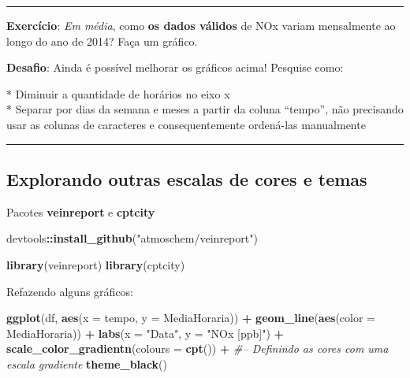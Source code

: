 \documentclass[]{book}
\newenvironment{Shaded}{\begin{snugshade}}{\end{snugshade}}
\newcommand{\KeywordTok}[1]{\textcolor[rgb]{0.13,0.29,0.53}{\textbf{#1}}}
\newcommand{\DataTypeTok}[1]{\textcolor[rgb]{0.13,0.29,0.53}{#1}}
\newcommand{\StringTok}[1]{\textcolor[rgb]{0.31,0.60,0.02}{#1}}
\newcommand{\CommentTok}[1]{\textcolor[rgb]{0.56,0.35,0.01}{\textit{#1}}}
\newcommand{\OperatorTok}[1]{\textcolor[rgb]{0.81,0.36,0.00}{\textbf{#1}}}
\newcommand{\NormalTok}[1]{#1}
\theoremstyle{definition}
\theoremstyle{definition}
\theoremstyle{definition}
\theoremstyle{remark}
\begin{document}
\begin{center}\rule{0.5\linewidth}{\linethickness}\end{center}

{\textbf{Exercício}: \emph{Em média}, como \textbf{os dados válidos} de
NOx variam mensalmente ao longo do ano de 2014? Faça um gráfico.}

{\textbf{Desafio}: Ainda é possível melhorar os gráficos acima! Pesquise
como:}

{* Diminuir a quantidade de horários no eixo x}\\
{* Separar por dias da semana e meses a partir da coluna ``tempo'', não
precisando usar as colunas de caracteres e consequentemente ordená-las
manualmente}

\begin{center}\rule{0.5\linewidth}{\linethickness}\end{center}

\subsection{Explorando outras escalas de cores e
temas}\label{explorando-outras-escalas-de-cores-e-temas}

Pacotes \textbf{veinreport} e \textbf{cptcity}

\begin{Shaded}
\begin{Highlighting}[]
\NormalTok{devtools}\OperatorTok{::}\KeywordTok{install_github}\NormalTok{(}\StringTok{"atmoschem/veinreport"}\NormalTok{)}
\end{Highlighting}
\end{Shaded}

\begin{Shaded}
\begin{Highlighting}[]
\KeywordTok{library}\NormalTok{(veinreport)}
\KeywordTok{library}\NormalTok{(cptcity)}
\end{Highlighting}
\end{Shaded}

Refazendo alguns gráficos:

\begin{Shaded}
\begin{Highlighting}[]
\KeywordTok{ggplot}\NormalTok{(df, }\KeywordTok{aes}\NormalTok{(}\DataTypeTok{x =}\NormalTok{ tempo, }\DataTypeTok{y =}\NormalTok{ MediaHoraria)) }\OperatorTok{+}\StringTok{ }
\StringTok{  }\KeywordTok{geom_line}\NormalTok{(}\KeywordTok{aes}\NormalTok{(}\DataTypeTok{color =}\NormalTok{ MediaHoraria)) }\OperatorTok{+}
\StringTok{  }\KeywordTok{labs}\NormalTok{(}\DataTypeTok{x =} \StringTok{"Data"}\NormalTok{, }\DataTypeTok{y =} \StringTok{"NOx [ppb]"}\NormalTok{) }\OperatorTok{+}
\StringTok{  }\KeywordTok{scale_color_gradientn}\NormalTok{(}\DataTypeTok{colours =} \KeywordTok{cpt}\NormalTok{()) }\OperatorTok{+}\StringTok{ }\CommentTok{#-- Definindo as cores com uma escala gradiente}
\StringTok{  }\KeywordTok{theme_black}\NormalTok{()}
\end{Highlighting}
\end{Shaded}
\end{document}
